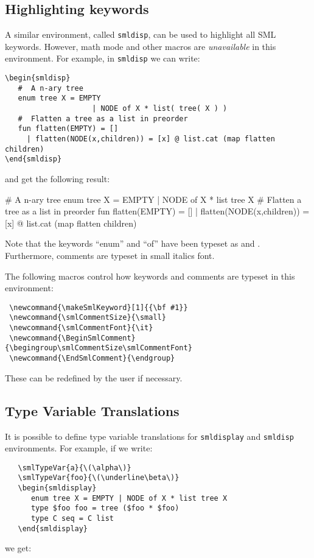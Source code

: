 \documentclass{article}
\begin{document}
\subsection{Highlighting keywords}
A similar environment, called \verb|smldisp|, can be used to highlight
all SML keywords.   However, math mode and other macros are {\em unavailable}
in this environment.  For example, in \verb|smldisp| we can write:
\begin{verbatim}
\begin{smldisp} 
   #  A n-ary tree 
   enum tree X = EMPTY 
                    | NODE of X * list( tree( X ) )
   #  Flatten a tree as a list in preorder 
   fun flatten(EMPTY) = []
     | flatten(NODE(x,children)) = [x] @ list.cat (map flatten children)
\end{smldisp}
\end{verbatim}
and get the following result:
\begin{smldisp} 
   #  A n-ary tree 
   enum tree X = EMPTY 
                    | NODE of X * list tree X
   #  Flatten a tree as a list in preorder 
   fun flatten(EMPTY) = []
     | flatten(NODE(x,children)) = [x] @ list.cat (map flatten children)
\end{smldisp}

Note that the keywords ``enum'' and ``of'' have been typeset as
 and .  Furthermore, comments are typeset
in small italics font.   

The following macros control how keywords and comments are typeset
in this environment:
\begin{verbatim}
 \newcommand{\makeSmlKeyword}[1]{{\bf #1}}
 \newcommand{\smlCommentSize}{\small}
 \newcommand{\smlCommentFont}{\it}
 \newcommand{\BeginSmlComment}{\begingroup\smlCommentSize\smlCommentFont}
 \newcommand{\EndSmlComment}{\endgroup}
\end{verbatim}
These can be redefined by the user if necessary.

\subsection{Type Variable Translations}
It is possible to define type variable translations for
\verb|smldisplay| and \verb|smldisp| environments.  For example, 
if we write:
\begin{verbatim}
   \smlTypeVar{a}{\(\alpha\)}
   \smlTypeVar{foo}{\(\underline\beta\)}
   \begin{smldisplay} 
      enum tree X = EMPTY | NODE of X * list tree X
      type $foo foo = tree ($foo * $foo)
      type C seq = C list
   \end{smldisplay}
\end{verbatim}
we get:
\end{document}
